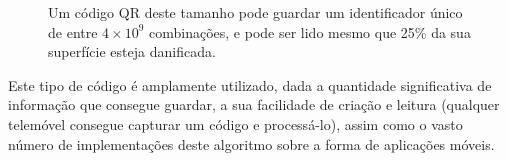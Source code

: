 \documentclass[11pt, a4paper, oneside]{book}
\begin{document}
\begin{figure}[ht]
  \centering
  
  \caption{Um código QR deste tamanho pode guardar um identificador único de entre $4 \times 10^{9}$ combinações, e pode ser lido mesmo que 25\% da sua superfície esteja danificada.}
\end{figure}

Este tipo de código é amplamente utilizado, dada a quantidade significativa de informação que consegue guardar, a sua facilidade de criação e leitura (qualquer telemóvel consegue capturar um código e processá-lo), assim como o vasto número de implementações deste algoritmo sobre a forma de aplicações móveis.

\nocite{*}

\clearpage
{}



\end{document}
